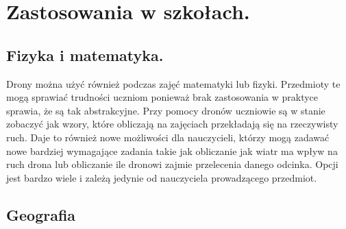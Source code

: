 \documentclass{article}
\begin{document}
\section{Zastosowania w szkołach.}

\subsection{Fizyka i matematyka.}

Drony można użyć również podczas zajęć matematyki lub fizyki. Przedmioty te mogą sprawiać trudności uczniom ponieważ brak zastosowania w praktyce sprawia, że są tak abstrakcyjne. Przy pomocy dronów uczniowie są w stanie zobaczyć jak wzory, które obliczają na zajęciach przekładają się na rzeczywisty ruch. Daje to również nowe możliwości dla nauczycieli, którzy mogą zadawać nowe bardziej wymagające zadania takie jak obliczanie jak wiatr ma wpływ na ruch drona lub obliczanie ile dronowi zajmie przelecenia danego odcinka. Opcji jest bardzo wiele i zależą jedynie od nauczyciela prowadzącego przedmiot.

\subsection{Geografia}
\end{document}
